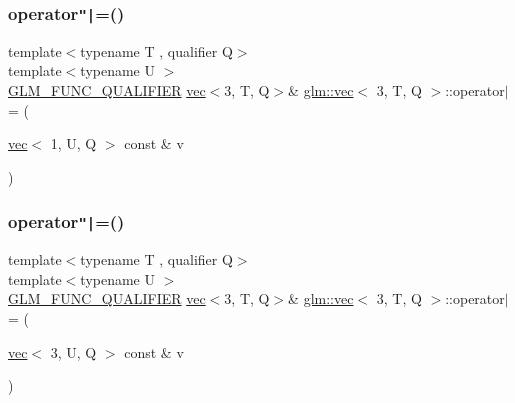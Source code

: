 \mbox{\label{structglm_1_1vec_3_013_00_01_t_00_01_q_01_4_a989756f0f4b1dfb7c3b6e07f30cbd790}} 
\subsubsection{\texorpdfstring{operator\texttt{"|}=()}{operator|=()}\hspace{0.1cm}{\footnotesize\ttfamily [5/6]}}
{\footnotesize\ttfamily template$<$typename T , qualifier Q$>$ \\
template$<$typename U $>$ \\
\hyperlink{setup_8hpp_a33fdea6f91c5f834105f7415e2a64407}{G\+L\+M\+\_\+\+F\+U\+N\+C\+\_\+\+Q\+U\+A\+L\+I\+F\+I\+ER} \hyperlink{structglm_1_1vec}{vec}$<$3, T, Q$>$\& \hyperlink{structglm_1_1vec}{glm\+::vec}$<$ 3, T, Q $>$\+::operator$\vert$= (\begin{DoxyParamCaption}\item[{\hyperlink{structglm_1_1vec}{vec}$<$ 1, U, Q $>$ const \&}]{v }\end{DoxyParamCaption})}

\mbox{\label{structglm_1_1vec_3_013_00_01_t_00_01_q_01_4_a7294cce332c6969861099356e29fbaa3}} 
\subsubsection{\texorpdfstring{operator\texttt{"|}=()}{operator|=()}\hspace{0.1cm}{\footnotesize\ttfamily [6/6]}}
{\footnotesize\ttfamily template$<$typename T , qualifier Q$>$ \\
template$<$typename U $>$ \\
\hyperlink{setup_8hpp_a33fdea6f91c5f834105f7415e2a64407}{G\+L\+M\+\_\+\+F\+U\+N\+C\+\_\+\+Q\+U\+A\+L\+I\+F\+I\+ER} \hyperlink{structglm_1_1vec}{vec}$<$3, T, Q$>$\& \hyperlink{structglm_1_1vec}{glm\+::vec}$<$ 3, T, Q $>$\+::operator$\vert$= (\begin{DoxyParamCaption}\item[{\hyperlink{structglm_1_1vec}{vec}$<$ 3, U, Q $>$ const \&}]{v }\end{DoxyParamCaption})}



